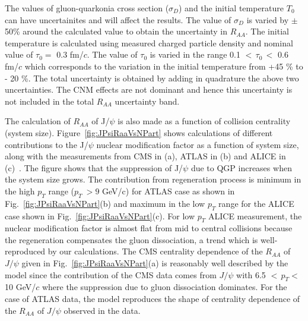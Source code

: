 \documentclass[12pt,a4paper,final]{iopart} %
\newcommand{\Jpsi}{J/\psi}
\begin{document}
The values of gluon-quarkonia cross section ($\sigma_{D}$) and the initial temperature $T_{0}$
can have uncertainites and will affect the results.
The value of $\sigma_D$ is varied by $\pm$50\% around the calculated value to obtain
the uncertainty in $R_{AA}$.  The initial temperature is calculated using measured
charged particle density and nominal value of $\tau_0 =$ 0.3 fm/$c$. The value of $\tau_0$
is varied  in the range 0.1 $<\,\tau_0\,<$ 0.6 fm/$c$ which corresponds to the
variation in the initial temperature from +45 \% to - 20 \%. The total uncertainty is
obtained by adding in quadrature the above two uncertainties.
The CNM effects are not dominant and hence this uncertainty  is not included in the
total $R_{AA}$ uncertainty band.


 The calculation of $R_{AA}$ of J/$\psi$ is also made as a function of collision
centrality (system size). 
Figure~\ref{fig:JPsiRaaVsNPart} shows calculations of different contributions to the J/$\psi$ 
nuclear modification factor as a function of system size, along with the measurements
from CMS in (a), ATLAS in (b) and ALICE in (c)~\cite{Sirunyan:2017isk,ATLAS:2016qpn,Adam:2016rdg}.
The figure shows that the suppression of J/$\psi$ due to
QGP increases when the system size grows. The contribution from regeneration process
is minimum in the high $p_T$ range ($p_T~>9$ GeV/c) for ATLAS case
as shown in Fig.~\ref{fig:JPsiRaaVsNPart}(b) and maximum in the low $p_T$ range
for the ALICE case shown in Fig.~\ref{fig:JPsiRaaVsNPart}(c). For low $p_T$ ALICE measurement,
the nuclear modification factor is almost flat from mid to central collisions because
the regeneration compensates the gluon dissociation, a trend which is well-reproduced
by our calculations.
The CMS centrality dependence of the $R_{AA}$ of $\Jpsi$ given in
Fig.~\ref{fig:JPsiRaaVsNPart}(a) is reasonably well described by the model since 
the contribution of the CMS data comes from $\Jpsi$ with 6.5 $<\,p_T<\,$10 GeV/$c$
where the suppression due to gluon dissociation dominates.
For the case of ATLAS data, the model reproduces the shape of centrality dependence
of the $R_{AA}$ of $\Jpsi$ observed in the data.
 
\end{document}
